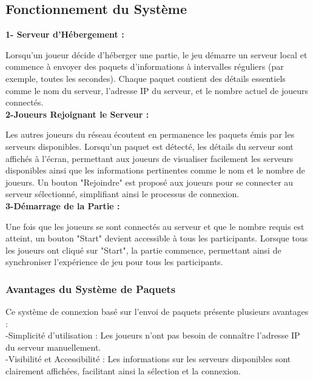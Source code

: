       \subsection*{Fonctionnement du Système}
      \textbf{1- Serveur d'Hébergement :}

      Lorsqu'un joueur décide d'héberger une partie, le jeu démarre un serveur local et commence à envoyer des paquets d'informations à intervalles réguliers 
      (par exemple, toutes les secondes).
      Chaque paquet contient des détails essentiels comme le nom du serveur, l'adresse IP du serveur, et le nombre actuel de joueurs connectés.
      \\

      \textbf{2-Joueurs Rejoignant le Serveur :}

      Les autres joueurs du réseau écoutent en permanence les paquets émis par les serveurs disponibles.
      Lorsqu'un paquet est détecté, les détails du serveur sont affichés à l'écran, permettant aux joueurs de visualiser facilement les serveurs disponibles ainsi que les informations pertinentes comme le nom et le nombre de joueurs.
      Un bouton "Rejoindre" est proposé aux joueurs pour se connecter au serveur sélectionné, simplifiant ainsi le processus de connexion.
\\

      \textbf{3-Démarrage de la Partie :}

      Une fois que les joueurs se sont connectés au serveur et que le nombre requis est atteint, un bouton "Start" devient accessible à tous les participants.
      Lorsque tous les joueurs ont cliqué sur "Start", la partie commence, permettant ainsi de synchroniser l'expérience de jeu pour tous les participants.

      \subsubsection*{Avantages du Système de Paquets}

      Ce système de connexion basé sur l'envoi de paquets présente plusieurs avantages :
\\

      -Simplicité d'utilisation : Les joueurs n'ont pas besoin de connaître l'adresse IP du serveur manuellement.
      \\

      -Visibilité et Accessibilité : Les informations sur les serveurs disponibles sont clairement affichées, facilitant ainsi la sélection et la connexion.
      \\

